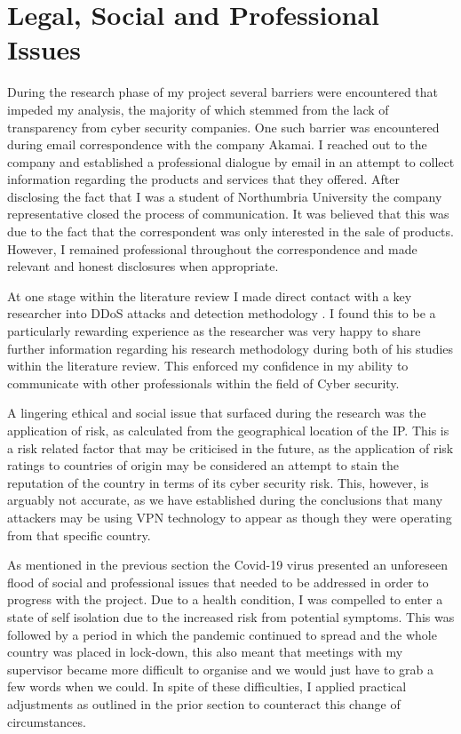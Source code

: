 \section{Legal, Social and Professional Issues}

During the research phase of my project several barriers were encountered that impeded my analysis, the majority of which stemmed from the lack of transparency from cyber security companies. One such barrier was encountered during email correspondence with the company Akamai. I reached out to the company and established a professional dialogue by email in an attempt to collect information regarding the products and services that they offered. After disclosing the fact that I was a student of Northumbria University the company representative closed the process of communication. It was believed that this was due to the fact that the correspondent was only interested in the sale of products. However, I remained professional throughout the correspondence and made relevant and honest disclosures when appropriate.

At one stage within the literature review I made direct contact with a key researcher into DDoS attacks and detection methodology \citeauthor{Adi2015}. I found this to be a particularly rewarding experience as the researcher was very happy to share further information regarding his research methodology during both of his studies within the literature review. This enforced my confidence in my ability to communicate with other professionals within the field of Cyber security.

A lingering ethical and social issue that surfaced during the research was the application of risk, as calculated from the geographical location of the IP. This is a risk related factor that may be criticised in the future, as the application of risk ratings to countries of origin may be considered an attempt to stain the reputation of the country in terms of its cyber security risk. This, however, is arguably not accurate, as we have established during the conclusions that many attackers may be using VPN technology to appear as though they were operating from that specific country.

As mentioned in the previous section the Covid-19 virus presented an unforeseen flood of social and professional issues that needed to be addressed in order to progress with the project. Due to a health condition, I was compelled to enter a state of self isolation due to the increased risk from potential symptoms. This was followed by a period in which the pandemic continued to spread and the whole country was placed in lock-down, this also meant that meetings with my supervisor became more difficult to organise and we would just have to grab a few words when we could. In spite of these difficulties, I applied practical adjustments as outlined in the prior section to counteract this change of circumstances. 